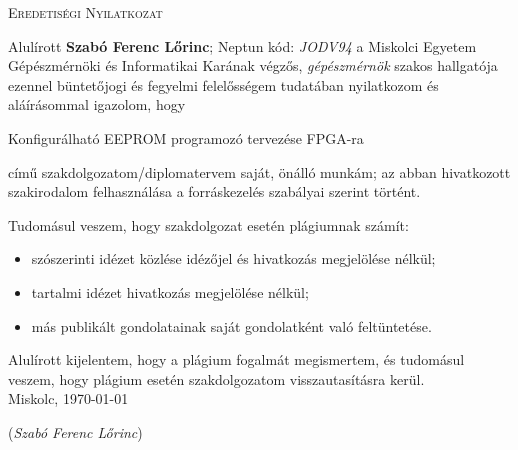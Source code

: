 \documentclass[a4paper,12pt,oneside]{book}
\newcommand{\nev}{Szabó Ferenc Lőrinc}
\newcommand{\neptun}{JODV94}
\newcommand{\cim}{Konfigurálható EEPROM programozó tervezése FPGA-ra}
\begin{document}
\thispagestyle{empty}
\clearpage
\thispagestyle{empty}
\begin{center}
	\textsc{\Large{Eredetiségi Nyilatkozat}}
\end{center}
{
Alulírott \textbf{\nev}; Neptun kód: \textit{\neptun} a Miskolci Egyetem Gépészmérnöki és Informatikai Karának végzős, \textit{gépészmérnök} szakos hallgatója ezennel büntetőjogi és fegyelmi felelősségem tudatában nyilatkozom és aláírásommal igazolom, hogy
\begin{center}
	\cim
\end{center}
című szakdolgozatom/diplomatervem saját, önálló munkám; az abban hivatkozott szakirodalom felhasználása a forráskezelés szabályai szerint történt.

Tudomásul veszem, hogy szakdolgozat esetén plágiumnak számít:
\begin{itemize}
	\item 	szószerinti idézet közlése idézőjel és hivatkozás megjelölése nélkül;
	\item	tartalmi idézet hivatkozás megjelölése nélkül;
	\item	más publikált gondolatainak saját gondolatként való feltüntetése.	 
\end{itemize}
Alulírott kijelentem, hogy a plágium fogalmát megismertem, és tudomásul veszem, hogy
plágium esetén szakdolgozatom visszautasításra kerül.\\
Miskolc, \today


{\raggedleft\vspace{1cm}(\textit{\nev})
	
}
}

\mainmatter

\clearpage
\tableofcontents
\listoffigures
\listoftables

\end{document}
